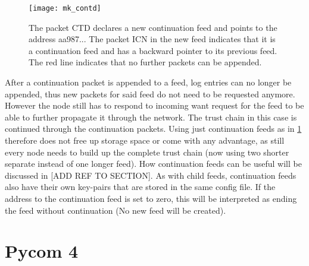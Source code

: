 \begin{figure}
\centering
\texttt{[image: mk\_contd]}
\caption{The packet CTD declares a new continuation feed and points to the address aa987... The packet ICN in the new feed indicates that it is a continuation feed and has a backward pointer to its previous feed. The red line indicates that no further packets can be appended.}
\label{fig:mk_contd}
\end{figure}

After a continuation packet is appended to a feed, log entries can no longer be appended, thus new packets for said feed do not need to be requested anymore. However the node still has to respond to incoming want request for the feed to be able to further propagate it through the network. The trust chain in this case is continued through the continuation packets. Using just continuation feeds as in \cref{fig:mk_contd} therefore does not free up storage space or come with any advantage, as still every node needs to build up the complete trust chain (now using two shorter separate instead of one longer feed). How continuation feeds can be useful will be discussed in [ADD REF TO SECTION]. As with child feeds, continuation feeds also have their own key-pairs that are stored in the same config file. If the address to the continuation feed is set to zero, this will be interpreted as ending the feed without continuation (No new feed will be created).









\section{Pycom 4}




